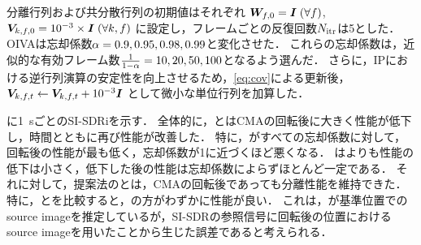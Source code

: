 \documentclass[sip,biber]{now-journal}
\begin{document}
分離行列および共分散行列の初期値はそれぞれ
$\bm{W} _{f,0} = \bm{I}\; (\forall f)$, $\bm{V} _{k,f,0} = 10^{-3}\times\bm{I}\; (\forall k, f)$
に設定し，フレームごとの反復回数$N _{\mathrm{itr}}$は5とした．
OIVAは忘却係数$\alpha = 0.9, 0.95, 0.98, 0.99$と変化させた．
これらの忘却係数は，近似的な有効フレーム数$\frac{1}{1 - \alpha} = 10, 20, 50, 100$となるよう選んだ．
さらに，IPにおける逆行列演算の安定性を向上させるため，\eqref{eq:cov}による更新後，
$\cov _{\src,\ft} \gets \cov _{\src,\ft} + 10 ^{-3} \Eye$
として微小な単位行列を加算した．

に\SI{1}{\second}ごとのSI-SDRiを示す．
全体的に，\NaiveIVA{}と\ResetIVA{}はCMAの回転後に大きく性能が低下し，時間とともに再び性能が改善した．
特に，\ResetIVA{}がすべての忘却係数に対して，回転後の性能が最も低く，忘却係数が1に近づくほど悪くなる．
\NaiveIVA{}は\ResetIVA{}よりも性能の低下は小さく，低下した後の性能は忘却係数によらずほとんど一定である．
それに対して，提案法の\RTCov{}と\RTObs{}は，CMAの回転後であっても分離性能を維持できた．
特に，\RTCov{}と\RTObs{}を比較すると，\RTCov{}の方がわずかに性能が良い．
これは，\RTObs{}が基準位置でのsource imageを推定しているが，SI-SDRの参照信号に回転後の位置におけるsource imageを用いたことから生じた誤差であると考えられる．
\end{document}
